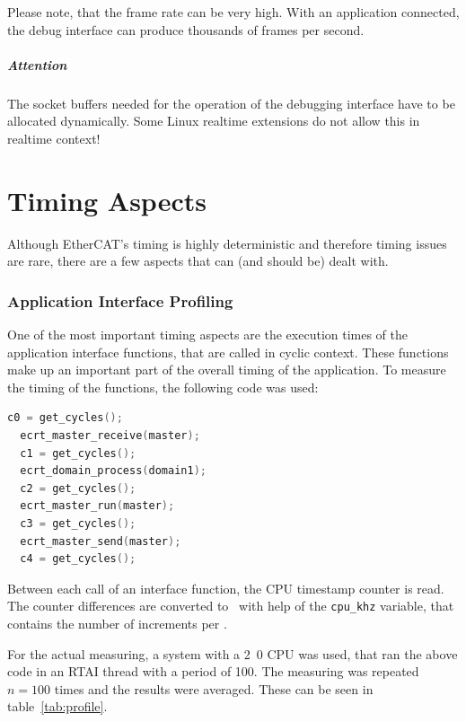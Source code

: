 \documentclass[a4paper,12pt,BCOR6mm,bibtotoc,idxtotoc]{scrbook}
\begin{document}
Please note, that the frame rate can be very high. With an application
connected, the debug interface can produce thousands of frames per second.

\paragraph{Attention} The socket buffers needed for the operation of the
debugging interface have to be allocated dynamically. Some Linux realtime
extensions do not allow this in realtime context!


\chapter{Timing Aspects}
\label{sec:timing}

Although EtherCAT's timing is highly deterministic and therefore timing issues
are rare, there are a few aspects that can (and should be) dealt with.


\subsection{Application Interface Profiling}
\label{sec:timing-profile}

One of the most important timing aspects are the execution times of the
application interface functions, that are called in cyclic context. These
functions make up an important part of the overall timing of the application.
To measure the timing of the functions, the following code was used:

\begin{lstlisting}[gobble=2,language=C]
  c0 = get_cycles();
  ecrt_master_receive(master);
  c1 = get_cycles();
  ecrt_domain_process(domain1);
  c2 = get_cycles();
  ecrt_master_run(master);
  c3 = get_cycles();
  ecrt_master_send(master);
  c4 = get_cycles();
\end{lstlisting}

Between each call of an interface function, the CPU timestamp counter is read.
The counter differences are converted to \micro\second\ with help of the
\lstinline+cpu_khz+ variable, that contains the number of increments per
\milli\second.

For the actual measuring, a system with a \unit{2.0}{\giga\hertz} CPU was used,
that ran the above code in an RTAI thread with a period of
\unit{100}{\micro\second}. The measuring was repeated $n = 100$ times and the
results were averaged. These can be seen in table~\ref{tab:profile}.
\end{document}
